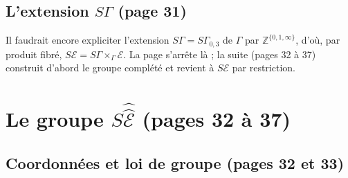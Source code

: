 \documentclass[11pt,a4paper]{article}
\begin{document}
\subsection*{L'extension $S\Gamma$ (page 31)}

Il faudrait encore expliciter l'extension $S\Gamma = S\Gamma_{0,3}$ de $\Gamma$
par $\mathbb{Z}^{\{0,1,\infty\}}$, d'où, par produit fibré, $S\mathcal{E} =
S\Gamma \times_\Gamma \mathcal{E}$. La page s'arrête là ; la suite
(pages 32 à 37) construit d'abord le groupe complété et revient à
$S\mathcal{E}$ par restriction.

\section*{Le groupe $S\hat{\hat{\mathcal{E}}}$ (pages 32 à 37)}

\subsection*{Coordonnées et loi de groupe (pages 32 et 33)}
\end{document}
